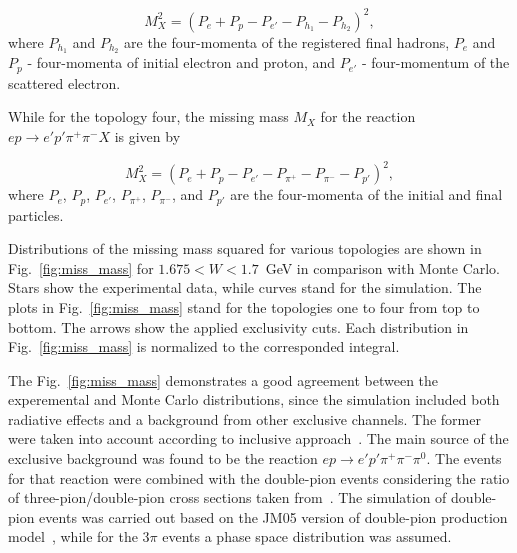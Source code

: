 \documentclass[prc,twocolumn,superscriptaddress,showpacs,amssymb,amsmath,amsfonts,linenumbers,aps]{revtex4-1}
\begin{document}
\begin{equation}
M_{X}^{2} = (P_{e} + P_{p} -P_{e'} - P_{h_1} - P_{h_2})^{2},
\label{eg:miss_mass}
\end{equation} 
where $P_{h_1}$ and $P_{h_2}$ are the four-momenta of the registered final hadrons, $P_{e}$ and $P_{p}$ - four-momenta of initial electron and proton, and $P_{e'}$ - four-momentum of the scattered electron.

While for the topology four, the missing mass $M_{X}$ for the reaction $e p \rightarrow e' p' \pi^+ \pi^- X$ is given by

\begin{equation}
M_{X}^{2} = (P_{e} + P_{p} -P_{e'} - P_{\pi^+} - P_{\pi^-} - P_{p'})^{2},
\label{eg:miss_mass_zero}
\end{equation} 
where $P_{e}$, $P_{p}$, $P_{e'}$, $P_{\pi^+}$, $P_{\pi^-}$,  and $P_{p'}$  are the four-momenta of the initial and final particles.

 


Distributions of the missing mass squared for various topologies are shown in Fig.~\ref{fig:miss_mass} for $1.675 < W < 1.7$~GeV in comparison with Monte Carlo. Stars show the experimental data, while curves stand for the simulation.
The plots in Fig.~\ref{fig:miss_mass} stand for the topologies one to four from top to bottom. The arrows show the applied exclusivity cuts. 
Each distribution in Fig.~\ref{fig:miss_mass} is normalized to the corresponded integral.

 
The Fig.~\ref{fig:miss_mass} demonstrates a good agreement between the experemental and Monte Carlo distributions,  since the simulation included both radiative effects and a background from other exclusive channels. 
The former were taken into account according to inclusive approach~\cite{Mo:1968cg}. 
The main source of the exclusive background was found to be the reaction $e p \rightarrow e' p' \pi^{+} \pi^{-} \pi^{0}$. The events for that reaction were combined with the double-pion events 
considering the ratio of three-pion/double-pion cross sections
 taken from~\cite{Wu:2005wf}. The simulation of double-pion events was carried out based on the JM05 version of double-pion production model~\cite{Ripani:2000va,Aznauryan:2005tp,Mokeev:2005re}, while for the $3\pi$ events a phase space distribution was assumed. 
\end{document}

